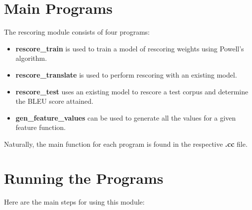 \documentclass[12pt]{amsart}
\newcommand{\file}{\textbf} \newcommand{\url}{\underline}
\begin{document}
\section*{Main Programs}

The rescoring module consists of four programs:
\begin{itemize}
\item \textbf{rescore\_train} is used to train a model of rescoring weights
      using Powell's algorithm.
\item \textbf{rescore\_translate} is used to perform rescoring with an existing
      model.
\item \textbf{rescore\_test} uses an existing model to rescore a test corpus
      and determine the BLEU score attained.
\item \textbf{gen\_feature\_values} can be used to generate all the values for
      a given feature function.
\end{itemize}

Naturally, the main function for each program is found in the respective
\file{.cc} file.

\section*{Running the Programs}

Here are the main steps for using this module:
\end{document}
